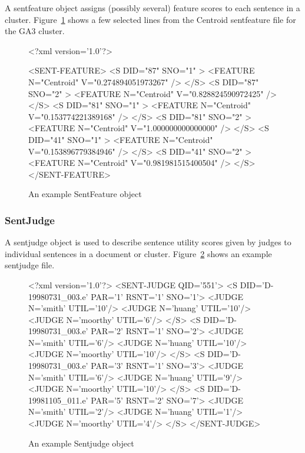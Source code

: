\documentclass[10pt]{article}
\begin{document}
A sentfeature object assigns (possibly several) feature scores to
each sentence in a cluster.
Figure~\ref{figure:sentfeature-example} shows a few selected
lines from the Centroid sentfeature file for the GA3 cluster.

\begin{figure}[htp!]
\centering
\begin{boxedverbatim}
<?xml version='1.0'?>

<SENT-FEATURE>
        <S DID="87" SNO="1" >
                <FEATURE N="Centroid" V="0.274894051973267" />
        </S>
        <S DID="87" SNO="2" >
                <FEATURE N="Centroid" V="0.828824590972425" />
        </S>
        <S DID="81" SNO="1" >
                <FEATURE N="Centroid" V="0.153774221389168" />
        </S>
        <S DID="81" SNO="2" >
                <FEATURE N="Centroid" V="1.000000000000000" />
        </S>
        <S DID="41" SNO="1" >
                <FEATURE N="Centroid" V="0.153896779384946" />
        </S>
        <S DID="41" SNO="2" >
                <FEATURE N="Centroid" V="0.981981515400504" />
        </S>
</SENT-FEATURE>
\end{boxedverbatim}
\caption{An example SentFeature object}
\label{figure:sentfeature-example}
\end{figure}



\subsubsection {SentJudge}

A sentjudge object is used to describe sentence utility scores given
by judges to individual sentences in a document or cluster.
Figure~\ref{figure:sentjudge-example} shows an example
sentjudge file.

\begin{figure}[htp!]
\centering
\begin{boxedverbatim}
<?xml version='1.0'?>
<SENT-JUDGE QID='551'>
<S DID='D-19980731_003.e' PAR='1' RSNT='1' SNO='1'>
                <JUDGE N='smith' UTIL='10'/>
                <JUDGE N='huang' UTIL='10'/>
                <JUDGE N='moorthy' UTIL='6'/>
</S>
<S DID='D-19980731_003.e' PAR='2' RSNT='1' SNO='2'>
                <JUDGE N='smith' UTIL='6'/>
                <JUDGE N='huang' UTIL='10'/>
                <JUDGE N='moorthy' UTIL='10'/>
</S>
<S DID='D-19980731_003.e' PAR='3' RSNT='1' SNO='3'>
                <JUDGE N='smith' UTIL='6'/>
                <JUDGE N='huang' UTIL='9'/>
                <JUDGE N='moorthy' UTIL='10'/>
</S>
<S DID='D-19981105_011.e' PAR='5' RSNT='2' SNO='7'>
                <JUDGE N='smith' UTIL='2'/>
                <JUDGE N='huang' UTIL='1'/>
                <JUDGE N='moorthy' UTIL='4'/>
</S>
</SENT-JUDGE>
\end{boxedverbatim}
\caption{An example Sentjudge object}
\label{figure:sentjudge-example}
\end{figure}
\end{document}
